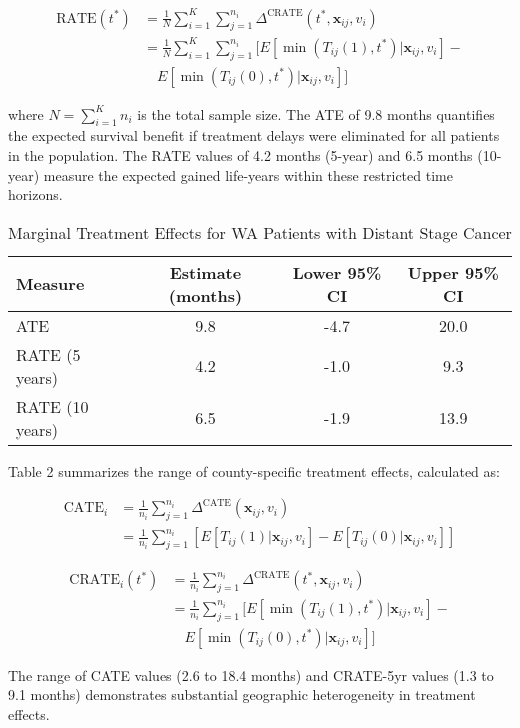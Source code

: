 \documentclass[useAMS,referee]{biom}
\begin{document}
\begin{align}
\text{RATE}(t^*) &= \frac{1}{N}\sum_{i=1}^{K}\sum_{j=1}^{n_i}\Delta^{\text{CRATE}}(t^*, \mathbf{x}_{ij}, v_i) \\
&= \frac{1}{N}\sum_{i=1}^{K}\sum_{j=1}^{n_i}[E[\min(T_{ij}(1),t^*) | \mathbf{x}_{ij}, v_i] - \\
&\quad E[\min(T_{ij}(0),t^*) | \mathbf{x}_{ij}, v_i]]
\end{align}

where $N = \sum_{i=1}^{K}n_i$ is the total sample size. The ATE of 9.8 months quantifies the expected survival benefit if treatment delays were eliminated for all patients in the population. The RATE values of 4.2 months (5-year) and 6.5 months (10-year) measure the expected gained life-years within these restricted time horizons.

\begin{table}[ht]
\centering
\caption{Marginal Treatment Effects for WA Patients with Distant Stage Cancer}
\begin{tabular}{lccc}
\hline
Measure & Estimate (months) & Lower 95\% CI & Upper 95\% CI \\
\hline
ATE & 9.8 & -4.7 & 20.0 \\
RATE (5 years) & 4.2 & -1.0 & 9.3 \\
RATE (10 years) & 6.5 & -1.9 & 13.9 \\
\hline
\end{tabular}
\end{table}

Table 2 summarizes the range of county-specific treatment effects, calculated as:

\begin{align}
\text{CATE}_i &= \frac{1}{n_i}\sum_{j=1}^{n_i}\Delta^{\text{CATE}}(\mathbf{x}_{ij}, v_i) \\
&= \frac{1}{n_i}\sum_{j=1}^{n_i}[E[T_{ij}(1) | \mathbf{x}_{ij}, v_i] - E[T_{ij}(0) | \mathbf{x}_{ij}, v_i]]
\end{align}

\begin{align}
\text{CRATE}_i(t^*) &= \frac{1}{n_i}\sum_{j=1}^{n_i}\Delta^{\text{CRATE}}(t^*, \mathbf{x}_{ij}, v_i) \\
&= \frac{1}{n_i}\sum_{j=1}^{n_i}[E[\min(T_{ij}(1),t^*) | \mathbf{x}_{ij}, v_i] - \\
&\quad E[\min(T_{ij}(0),t^*) | \mathbf{x}_{ij}, v_i]]
\end{align}

The range of CATE values (2.6 to 18.4 months) and CRATE-5yr values (1.3 to 9.1 months) demonstrates substantial geographic heterogeneity in treatment effects.
\end{document}
